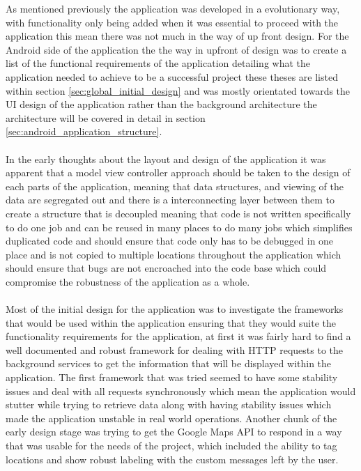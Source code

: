 As mentioned previously the application was developed in a evolutionary way, with functionality only being added when it was essential to proceed with the application this mean there was not much in the way of up front design. For the Android side of the application the the way in upfront of design was to create a list of the functional requirements of the application detailing what the application needed to achieve to be a successful project these theses are listed within section \ref{sec:global_initial_design} and was mostly orientated towards the UI design of the application rather than the background architecture the architecture will be covered in detail in section \ref{sec:android_application_structure}.\\
\\
In the early thoughts about the layout and design of the application it was apparent that a model view controller approach should be taken to the design of each parts of the application, meaning that data structures, and viewing of the data are segregated out and there is a interconnecting layer between them to create a structure that is decoupled meaning that code is not written specifically to do one job and can be reused in many places to do many jobs which simplifies duplicated code and should ensure that code only has to be debugged in one place and is not copied to multiple locations throughout the application which should ensure that bugs are not encroached into the code base which could compromise the robustness of the application as a whole.\\
\\
Most of the initial design for the application was to investigate the frameworks that would be used within the application ensuring that they would suite the functionality requirements for the application, at first it was fairly hard to find a well documented and robust framework for dealing with HTTP requests to the background services to get the information that will be displayed within the application. The first framework that was tried seemed to have some stability issues and deal with all requests synchronously which mean the application would stutter while trying to retrieve data along with having stability issues which made the application unstable in real world operations. Another chunk of the early design stage was trying to get the Google Maps API to respond in a way that was usable for the needs of the project, which included the ability to tag locations and show robust labeling with the custom messages left by the user.\\

